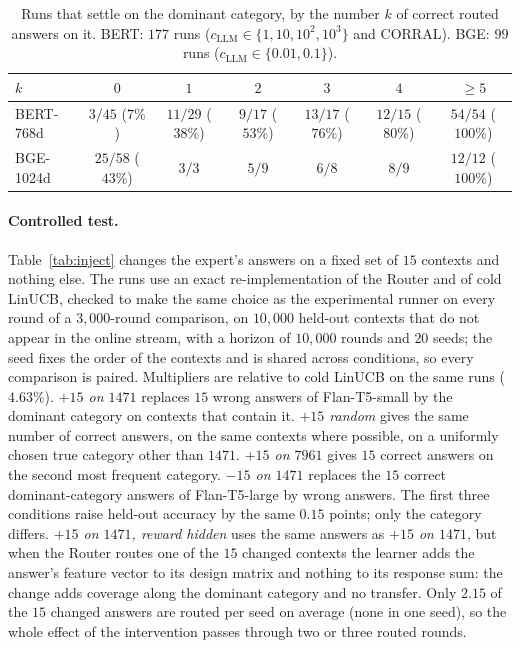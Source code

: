 \documentclass[anon]{alt2027} %
\begin{document}
\begin{table}[h]
\centering
\caption{Runs that settle on the dominant category, by the number $k$ of
correct routed answers on it. BERT: $177$ runs ($c_{\mathrm{LLM}}\in\{1,10,10^2,10^3\}$ and
CORRAL). BGE: $99$ runs ($c_{\mathrm{LLM}}\in\{0.01,0.1\}$).}
\label{tab:dose}
\small
\begin{tabular}{@{}lcccccc@{}}
\toprule
$k$ & $0$ & $1$ & $2$ & $3$ & $4$ & $\ge5$ \\
\midrule
BERT-768d & $3/45$ ($7\%$) & $11/29$ ($38\%$) & $9/17$ ($53\%$) & $13/17$ ($76\%$) & $12/15$ ($80\%$) & $54/54$ ($100\%$) \\
BGE-1024d & $25/58$ ($43\%$) & $3/3$ & $5/9$ & $6/8$ & $8/9$ & $12/12$ ($100\%$) \\
\bottomrule
\end{tabular}
\end{table}

\paragraph{Controlled test.}
Table~\ref{tab:inject} changes the expert's answers on a fixed set of $15$
contexts and nothing else. The runs use an exact re-implementation of the
Router and of cold LinUCB, checked to make the same choice as the
experimental runner on every round of a $3{,}000$-round comparison, on
$10{,}000$ held-out contexts that do not appear in the online stream, with a
horizon of $10{,}000$ rounds and $20$ seeds; the seed fixes the order of the
contexts and is shared across conditions, so every comparison is paired.
Multipliers are relative to cold LinUCB on the same runs ($4.63\%$).
\emph{$+15$ on $1471$} replaces $15$ wrong answers of Flan-T5-small by the
dominant category on contexts that contain it. \emph{$+15$ random} gives the
same number of correct answers, on the same contexts where possible, on a
uniformly chosen true category other than $1471$. \emph{$+15$ on $7961$}
gives $15$ correct answers on the second most frequent category.
\emph{$-15$ on $1471$} replaces the $15$ correct dominant-category answers of
Flan-T5-large by wrong answers. The first three conditions raise held-out
accuracy by the same $0.15$ points; only the category differs.
\emph{$+15$ on $1471$, reward hidden} uses the same answers as \emph{$+15$ on
$1471$}, but when the Router routes one of the $15$ changed contexts the
learner adds the answer's feature vector to its design matrix and nothing to
its response sum: the change adds coverage along the dominant category and no
transfer. Only $2.15$ of the $15$ changed answers are routed per seed on
average (none in one seed), so the whole effect of the intervention passes
through two or three routed rounds.
\end{document}
